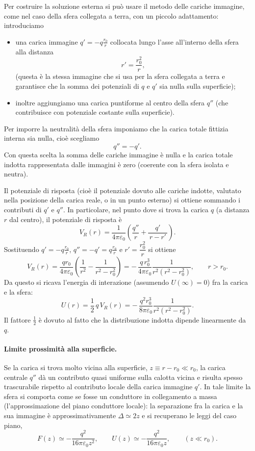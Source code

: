 \documentclass{book}
\begin{document}
Per costruire la soluzione esterna si può usare il metodo delle cariche immagine, come nel caso della sfera collegata a terra, con un piccolo adattamento: introduciamo
\begin{itemize}
  \item una carica immagine $q'=-q\frac{r_0}{r}$ collocata lungo l'asse all'interno della sfera alla distanza
  \[
  r'=\frac{r_0^2}{r},
  \]
  (questa è la stessa immagine che si usa per la sfera collegata a terra e garantisce che la somma dei potenziali di $q$ e $q'$ sia nulla sulla superficie);
  \item inoltre aggiungiamo una carica puntiforme al centro della sfera $q''$ (che contribuisce con potenziale costante sulla superficie).
\end{itemize}

Per imporre la neutralità della sfera imponiamo che la carica totale fittizia interna sia nulla, cioè scegliamo
\[
q''=-q'.
\]
Con questa scelta la somma delle cariche immagine è nulla e la carica totale indotta rappresentata dalle immagini è zero (coerente con la sfera isolata e neutra).

Il potenziale di risposta (cioè il potenziale dovuto alle cariche indotte, valutato nella posizione della carica reale, o in un punto esterno) si ottiene sommando i contributi di $q'$ e $q''$. In particolare, nel punto dove si trova la carica $q$ (a distanza $r$ dal centro), il potenziale di risposta è
\[
V_R(r)=\frac{1}{4\pi\varepsilon_0}\left(\frac{q''}{r}+\frac{q'}{\,r-r'\,}\right).
\]
Sostituendo $q'=-q\frac{r_0}{r}$, $q''=-q' = q\frac{r_0}{r}$ e $r'=\dfrac{r_0^2}{r}$ si ottiene
\[
V_R(r)=\frac{q r_0}{4\pi\varepsilon_0}\!\left(\frac{1}{r^2}-\frac{1}{r^2-r_0^2}\right)
= -\,\frac{q\,r_0^3}{4\pi\varepsilon_0}\frac{1}{r^2(r^2-r_0^2)},\qquad r>r_0.
\]
Da questo si ricava l'energia di interazione (assumendo $U(\infty)=0$) fra la carica e la sfera:
\[
U(r)=\frac{1}{2}\,q\,V_R(r)
= -\,\frac{q^2 r_0^3}{8\pi\varepsilon_0}\frac{1}{r^2(r^2-r_0^2)}.
\]
Il fattore $\tfrac12$ è dovuto al fatto che la distribuzione indotta dipende linearmente da $q$.

\paragraph{Limite prossimità alla superficie.}
Se la carica si trova molto vicina alla superficie, $z\equiv r-r_0\ll r_0$, la carica centrale $q''$ dà un contributo quasi uniforme sulla calotta vicina e risulta spesso trascurabile rispetto al contributo locale della carica immagine $q'$. In tale limite la sfera si comporta come se fosse un conduttore in collegamento a massa (l'approssimazione del piano conduttore locale): la separazione fra la carica e la sua immagine è approssimativamente $\Delta\simeq 2z$ e si recuperano le leggi del caso piano,
\[
F(z)\simeq -\frac{q^2}{16\pi\varepsilon_0 z^2},\qquad
U(z)\simeq -\frac{q^2}{16\pi\varepsilon_0 z},\qquad (z\ll r_0).
\]
\end{document}
